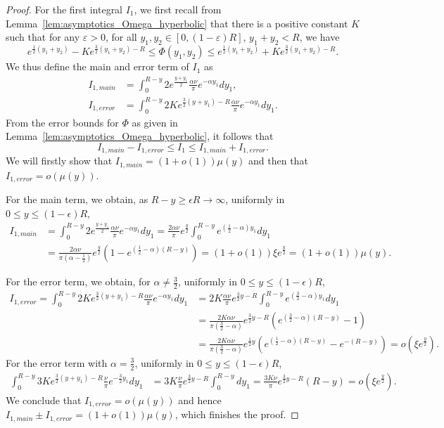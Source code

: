 \begin{proof}
For the first integral $I_1$, we first recall from Lemma~\ref{lem:asymptotics_Omega_hyperbolic} that there is a positive constant $K$ such that for any $\varepsilon >0$, for all $y_1, y_2 \in [0,(1-\varepsilon)R]$, $y_1+y_2 <R$, we have
\[
	e^{\frac{1}{2}(y_1+y_2)} - Ke^{\frac{3}{2}(y_1+y_2)-R} \leq \Phi(y_1,y_2) \leq e^{\frac{1}{2}(y_1+y_2)} + Ke^{\frac{3}{2}(y_1+y_2)-R}.
\]
We thus define the main and error term of $I_1$ as
\begin{align*}
I_{1,main} &=\int_0^{R-y} 2e^{\frac{y+y_1}{2}}\frac{\alpha\nu}{\pi}e^{-\alpha y_1}dy_1, \\
I_{1,error} &= \int_0^{R-y} 2Ke^{\frac{3}{2}(y+y_1)-R} \frac{\alpha\nu}{\pi} e^{-\alpha y_1} dy_1.
\end{align*}
From the error bounds for $\Phi$ as given in Lemma~\ref{lem:asymptotics_Omega_hyperbolic}, it follows that
$$I_{1,main}-I_{1,error} \leq I_1 \leq I_{1,main}+I_{1,error}. $$
We will firstly show that $I_{1,main} =(1+o(1))\mu(y) $ and then that $I_{1,error} = o(\mu(y))$.

For the main term, we obtain, as $R-y \geq \epsilon R \rightarrow \infty$, uniformly in $0\leq y\leq (1-\epsilon)R$,
\begin{align*}
I_{1,main} &= \int_0^{R-y} 2e^{\frac{y+y_1}{2}}\frac{\alpha\nu}{\pi}e^{-\alpha y_1}dy_1 
		= \frac{2\alpha\nu}{\pi}e^{\frac{y}{2}}\int_0^{R-y} e^{\left(\frac{1}{2}-\alpha\right)y_1}dy_1\\
	&=\frac{2\alpha\nu}{\pi\left(\alpha-\frac{1}{2}\right)}e^{\frac{y}{2}}
		\left(1-e^{\left(\frac{1}{2}-\alpha\right)(R-y)}\right)
		=(1+o(1))\xi e^{\frac{y}{2}} = (1+o(1))\mu(y).
\end{align*}

For the error term, we obtain, for $\alpha \not = \frac{3}{2}$, uniformly in $0\leq y\leq (1-\epsilon)R$,
\begin{align*}
I_{1,error}=\int_0^{R-y} 2Ke^{\frac{3}{2}(y+y_1)-R} \frac{\alpha\nu}{\pi} e^{-\alpha y_1} dy_1 &= 2K\frac{\alpha\nu}{\pi} e^{\frac{3}{2}y-R} \int_0^{R-y} e^{\left(\frac{3}{2}-\alpha\right)y_1}dy_1 \\
&= \frac{2K\alpha\nu}{\pi\left(\frac{3}{2}-\alpha\right)}e^{\frac{3}{2}y-R} \left(e^{\left(\frac{3}{2}-\alpha\right)(R-y)}-1\right)\\
&= \frac{2K\alpha\nu}{\pi\left(\frac{3}{2}-\alpha\right)}e^{\frac{1}{2}y} \left(e^{\left(\frac{1}{2}-\alpha\right)(R-y)}-e^{-(R-y)}\right) =o\left(\xi e^{\frac{y}{2}}\right).
\end{align*}
For the error term with $\alpha=\frac{3}{2}$, uniformly in $0\leq y\leq (1-\epsilon)R$,
\begin{align*}
\int_0^{R-y} 3Ke^{\frac{3}{2}(y+y_1)-R} \frac{\nu}{\pi} e^{-\frac{3}{2} y_1} dy_1 &= 3K\frac{\nu}{\pi} e^{\frac{3}{2}y-R} \int_0^{R-y} dy_1 = \frac{3K\nu}{\pi}e^{\frac{3}{2}y-R} (R-y) =o\left(\xi e^{\frac{y}{2}}\right).
\end{align*}
We conclude that $I_{1,error} = o(\mu(y))$ and hence $I_{1,main}\pm I_{1,error} = (1+o(1))\mu(y)$, which finishes the proof.
\end{proof}

